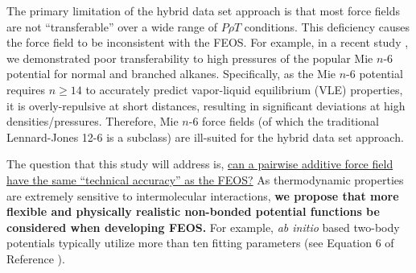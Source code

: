 \documentclass[12pt,a4paper]{article}
\begin{document}
 
 

The primary limitation of the hybrid data set approach is that most force fields are not ``transferable'' over a wide range of $P \rho T$ conditions. This deficiency causes the force field to be inconsistent with the FEOS. For example, in a recent study \cite{Messerly2018_2}, we demonstrated poor transferability to high pressures of the popular Mie $n$-6 potential for normal and branched alkanes. Specifically, as the Mie $n$-6 potential requires $n \ge 14$ to accurately predict vapor-liquid equilibrium (VLE) properties, it is overly-repulsive at short distances, resulting in significant deviations at high densities/pressures. Therefore, Mie $n$-6 force fields (of which the traditional Lennard-Jones 12-6 is a subclass) are ill-suited for the hybrid data set approach.

The question that this study will address is, \ul{can a pairwise additive force field have the same ``technical accuracy'' as the FEOS?} As thermodynamic properties are extremely sensitive to  intermolecular interactions, \textbf{we propose that more flexible and physically realistic non-bonded potential functions be considered when developing FEOS.} For example, \textit{ab initio} based two-body potentials typically utilize more than ten fitting parameters (see Equation 6 of Reference ). 
\end{document}
